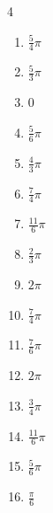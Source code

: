 \begin{multicols}{4}
\begin{enumerate}
  \item $\displaystyle \frac{5}{4}\pi$

  \item $\displaystyle \frac{5}{3}\pi$

  \item $\displaystyle 0$

  \item $\displaystyle \frac{5}{6}\pi$

  \item $\displaystyle \frac{4}{3}\pi$

  \item $\displaystyle \frac{7}{4}\pi$

  \item $\displaystyle \frac{11}{6}\pi$

  \item $\displaystyle \frac{2}{3}\pi$

  \item $\displaystyle 2\pi$

  \item $\displaystyle \frac{7}{4}\pi$

  \item $\displaystyle \frac{7}{6}\pi$

  \item $\displaystyle 2\pi$

  \item $\displaystyle \frac{3}{4}\pi$

  \item $\displaystyle \frac{11}{6}\pi$

  \item $\displaystyle \frac{5}{6}\pi$

  \item $\displaystyle \frac{\pi}{6}$


\end{enumerate}
\end{multicols}
